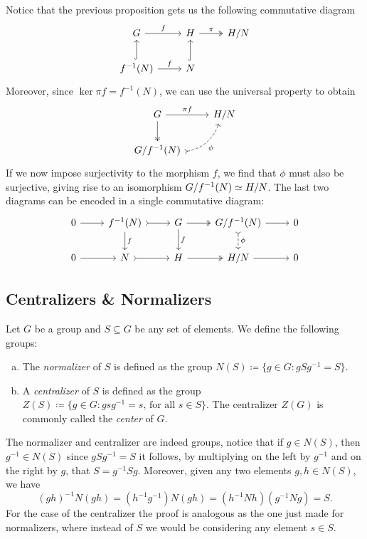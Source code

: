 Notice that the previous proposition gets us the following commutative diagram
\[
  \begin{tikzcd}
    G \ar[r, "f"] &H \ar[r, two heads, "\pi"] &H/N \\
    f^{-1}(N) \ar[u, hook] \ar[r, "f"] &N \ar[u, hook]
  \end{tikzcd}
\]
Moreover, since \(\ker \pi f = f^{-1}(N)\), we can use the universal property to
obtain
\[
  \begin{tikzcd}
    G \ar[d, two heads] \ar[r, "\pi f"] &H/N \\
    G/f^{-1}(N) \ar[ru, swap, tail, bend right, dashed, "\phi"] &
  \end{tikzcd}
\]
If we now impose surjectivity to the morphism \(f\), we find that \(\phi\) must
also be surjective, giving rise to an isomorphism \(G/f^{-1}(N) \simeq H/N\). The
last two diagrams can be encoded in a single commutative diagram:
\[
  \begin{tikzcd}
    0 \ar[r]
    &f^{-1}(N) \ar[d, "f"] \ar[r, tail]
    &G \ar[d, "f"] \ar[r, two heads]
    &G/f^{-1}(N) \ar[r] \ar[d, dashed, tail, "\phi"]
    &0 \\
    0 \ar[r]
    &N \ar[r, tail]
    &H \ar[r, two heads]
    &H/N \ar[r]
    &0
  \end{tikzcd}
\]

\subsection{Centralizers \& Normalizers}

\begin{definition}
\label{def:normalizer-centralizer}
Let \(G\) be a group and \(S \subseteq G\) be any set of elements. We define the
following groups:
\begin{enumerate}[(a)]\setlength\itemsep{0em}
\item The \emph{normalizer} of \(S\) is defined as the group
  \(N(S) \coloneq \{g \in G \colon g S g^{-1} = S\}\).
\item A \emph{centralizer} of \(S\) is defined as the group
  \(Z(S) \coloneq \{g \in G \colon g s g^{-1} = s \text{, for all } s \in
  S\}\). The centralizer \(Z(G)\) is commonly called the \emph{center} of \(G\).
\end{enumerate}
\end{definition}

The normalizer and centralizer are indeed groups, notice that if \(g \in N(S)\),
then \(g^{-1} \in N(S)\) since \(g S g^{-1} = S\) it follows, by multiplying on
the left by \(g^{-1}\) and on the right by \(g\), that
\(S = g^{-1} S g\). Moreover, given any two elements \(g, h \in N(S)\), we have
\[
  (g h)^{-1} N (g h) = (h^{-1} g ^{-1}) N (g h) = (h^{-1}N h) (g^{-1} N g) = S.
\]
For the case of the centralizer the proof is analogous as the one just made for
normalizers, where instead of \(S\) we would be considering any element
\(s \in S\).

